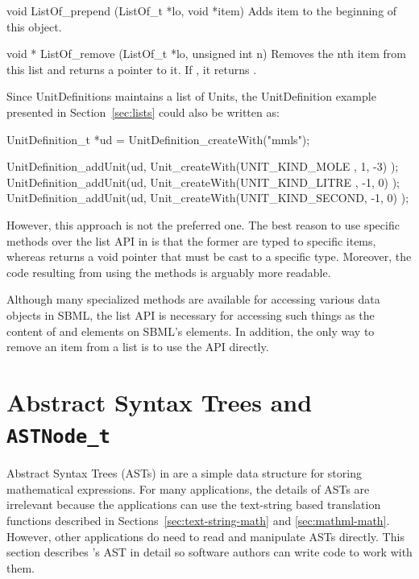 \documentclass{sbmlmanual}
\begin{document}
\begin{methoddef}{void ListOf\_prepend (ListOf\_t *lo, void *item)}
  Adds item to the beginning of this  object.
\end{methoddef}


\begin{methoddef}{void * ListOf\_remove (ListOf\_t *lo, unsigned int n)}
  Removes the nth item from this list and returns a pointer to it.  If 
  , it returns .
\end{methoddef}


Since UnitDefinitions maintains a list of Units, the UnitDefinition
example presented in Section~\ref{sec:lists} could also be written as:


\begin{example}[c]
  UnitDefinition_t *ud = UnitDefinition_createWith("mmls");
  
  UnitDefinition_addUnit(ud, Unit_createWith(UNIT_KIND_MOLE  ,  1, -3) );
  UnitDefinition_addUnit(ud, Unit_createWith(UNIT_KIND_LITRE , -1,  0) );
  UnitDefinition_addUnit(ud, Unit_createWith(UNIT_KIND_SECOND, -1,  0) );
\end{example}


However, this approach is not the preferred one.  The best reason to use
specific  methods over the list API in \libsbml{} is
that the former are typed to specific items, whereas 
returns a void pointer that must be cast to a specific type.  Moreover, the
code resulting from using the  methods is arguably
more readable.

Although many specialized methods are available for accessing various data
objects in SBML, the list API is necessary for accessing such things as the
content of  and  elements on SBML's
 elements.  In addition, the only way to remove an item
from a list is to use the API directly.


\section{Abstract Syntax Trees and \texttt{ASTNode\_t}}
\label{app:ast}

Abstract Syntax Trees (ASTs) in \libsbml{} are a simple data structure for
storing mathematical expressions.  For many applications, the details of
ASTs are irrelevant because the applications can use the text-string based
translation functions described in Sections~\ref{sec:text-string-math} and
\ref{sec:mathml-math}.  However, other applications do need to read and
manipulate ASTs directly.  This section describes \libsbml{}'s AST in
detail so software authors can write code to work with them.
\end{document}

